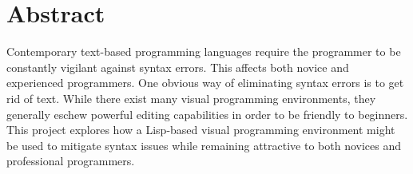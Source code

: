 \chapter{Abstract}
Contemporary text-based programming languages require the programmer to be
constantly vigilant against syntax errors. This affects both novice and
experienced programmers. One obvious way of eliminating syntax errors is to
get rid of text. While there exist many visual programming environments, they generally
eschew powerful editing capabilities in order to be friendly to beginners.
This project explores how a Lisp-based visual programming environment might be
used to mitigate syntax issues while remaining attractive to both novices and
professional programmers.
